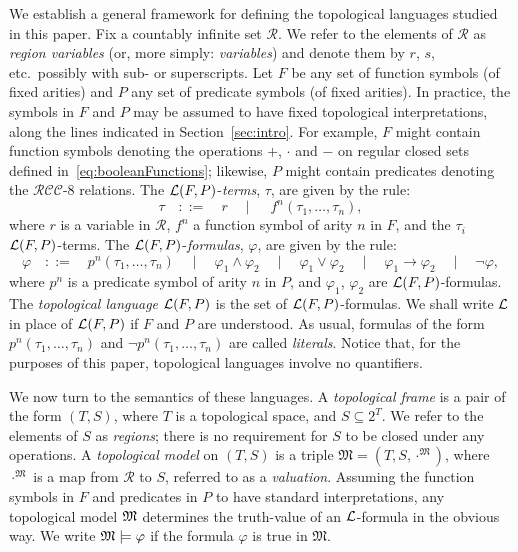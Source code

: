 \documentclass{LMCS}
\theoremstyle{plain}
\newcommand{\RCCE}{\ensuremath{\mathcal{RCC}\text{-}8}}\newcommand{\RCCEcc}{\ensuremath{\RCCE{}cc}}\newcommand{\RCCEc}{\ensuremath{\RCCE{}c}}
\newcommand{\Res}{{S}}\newcommand{\RegC}{\textsc{RC}}
\newcommand{\RVar}{\mathcal{R}}
\begin{document}
We establish a general framework for defining the topological
languages studied in this paper.  Fix a countably infinite set
$\RVar$. We refer to the elements of $\RVar$ as {\em region variables}
(or, more simply: {\em variables}) and denote them by $r$, $s$, etc.\ possibly with sub- or superscripts.  Let $F$ be any set of
function symbols (of fixed arities) and $P$ any set of predicate symbols (of
fixed arities). In practice, the symbols in $F$ and $P$ may be assumed
to have fixed topological interpretations, along the lines indicated
in Section~\ref{sec:intro}. For example, $F$ might contain
function symbols denoting the operations $+$, $\cdot$ and $-$ on
regular closed sets defined in~\eqref{eq:booleanFunctions};
likewise, $P$ might contain predicates denoting the $\RCCE$ relations.
The $\mathcal{L}(F,P)$-\emph{terms}, $\tau$, are given by the rule:
\begin{equation*}
\tau \quad ::= \quad r \quad \mid \quad \ f^n (\tau_1, \dots, \tau_n),
\end{equation*}
where $r$ is a variable in $\RVar$, $f^n$ a function symbol of arity
$n$ in $F$, and the $\tau_i$ $\mathcal{L}(F,P)$-terms. The $\mathcal{L}(F,P)$-\emph{formulas},
$\varphi$, are given by the rule:
\begin{equation*}
\varphi \quad ::= \quad p^n(\tau_1, \dots, \tau_n) \quad \mid \quad \varphi_1 \land \varphi_2 \quad \mid \quad \varphi_1 \lor \varphi_2
\quad \mid \quad \varphi_1 \to \varphi_2 \quad \mid \quad \neg\varphi ,
\end{equation*}
where $p^n$ is a predicate symbol of arity $n$ in $P$, and
$\varphi_1$, $\varphi_2$ are $\mathcal{L}(F,P)$-formulas.  The {\em
  topological language} $\mathcal{L}(F,P)$ is the set of
$\mathcal{L}(F,P)$-formulas. We shall write $\mathcal{L}$ in place of $\mathcal{L}(F,P)$ if
$F$ and $P$ are understood. As usual, formulas of the form
$p^n(\tau_1, \dots, \tau_n)$ and $\neg p^n(\tau_1, \dots, \tau_n)$ are
called \emph{literals}. Notice that, for the purposes of this paper,
topological languages involve no quantifiers.

We now turn to the semantics of these languages.  A \emph{topological
  frame} is a pair of the form $(T, \Res)$, where $T$ is a topological
space, and $\Res \subseteq 2^T$.  We refer to the elements of $\Res$
as \emph{regions}; there is no requirement for $\Res$ to be closed
under any operations.  A \emph{topological model} on $(T,\Res)$ is a
triple $\mathfrak M =(T,\Res,\cdot^{\mathfrak M})$, where
$\cdot^{\mathfrak M}$ is a map from $\RVar$ to $\Res$, referred to as
a \emph{valuation}. Assuming the function symbols in $F$ and
predicates in $P$ to have standard interpretations, any topological
model $\mathfrak{M}$ determines the truth-value of an $\mathcal{L}$-formula in the
obvious way. We write $\mathfrak{M} \models \varphi$ if the formula $\varphi$
is true in $\mathfrak M$.
\end{document}

